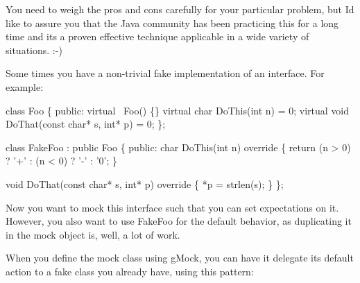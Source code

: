 You need to weigh the pros and cons carefully for your particular problem, but I\textquotesingle{}d like to assure you that the Java community has been practicing this for a long time and it\textquotesingle{}s a proven effective technique applicable in a wide variety of situations. \+:-\/)

Some times you have a non-\/trivial fake implementation of an interface. For example\+:


\begin{DoxyCode}
\textcolor{keyword}{class }Foo \{
 \textcolor{keyword}{public}:
  \textcolor{keyword}{virtual} ~Foo() \{\}
  \textcolor{keyword}{virtual} \textcolor{keywordtype}{char} DoThis(\textcolor{keywordtype}{int} n) = 0;
  \textcolor{keyword}{virtual} \textcolor{keywordtype}{void} DoThat(\textcolor{keyword}{const} \textcolor{keywordtype}{char}* s, \textcolor{keywordtype}{int}* p) = 0;
\};

\textcolor{keyword}{class }FakeFoo : \textcolor{keyword}{public} Foo \{
 \textcolor{keyword}{public}:
  \textcolor{keywordtype}{char} DoThis(\textcolor{keywordtype}{int} n)\textcolor{keyword}{ override }\{
    \textcolor{keywordflow}{return} (n > 0) ? \textcolor{charliteral}{'+'} :
           (n < 0) ? \textcolor{charliteral}{'-'} : \textcolor{charliteral}{'0'};
  \}

  \textcolor{keywordtype}{void} DoThat(\textcolor{keyword}{const} \textcolor{keywordtype}{char}* s, \textcolor{keywordtype}{int}* p)\textcolor{keyword}{ override }\{
    *p = strlen(s);
  \}
\};
\end{DoxyCode}


Now you want to mock this interface such that you can set expectations on it. However, you also want to use {\ttfamily Fake\+Foo} for the default behavior, as duplicating it in the mock object is, well, a lot of work.

When you define the mock class using g\+Mock, you can have it delegate its default action to a fake class you already have, using this pattern\+:


